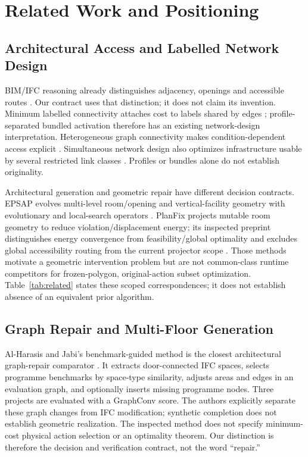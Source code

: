 \documentclass[conference]{IEEEtran}
\begin{document}
\section{Related Work and Positioning}
\subsection{Architectural Access and Labelled Network Design}
BIM/IFC reasoning already distinguishes adjacency, openings and accessible routes \cite{bim}. Our contract uses that distinction; it does not claim its invention. Minimum labelled connectivity attaches cost to labels shared by edges \cite{labels}; profile-separated bundled activation therefore has an existing network-design interpretation. Heterogeneous graph connectivity makes condition-dependent access explicit \cite{condition}. Simultaneous network design also optimizes infrastructure usable by several restricted link classes \cite{simultaneous}. Profiles or bundles alone do not establish originality.

Architectural generation and geometric repair have different decision contracts. EPSAP evolves multi-level room/opening and vertical-facility geometry with evolutionary and local-search operators \cite{epsap}. PlanFix projects mutable room geometry to reduce violation/displacement energy; its inspected preprint distinguishes energy convergence from feasibility/global optimality and excludes global accessibility routing from the current projector scope \cite{planfix}. Those methods motivate a geometric intervention problem but are not common-class runtime competitors for frozen-polygon, original-action subset optimization. Table~\ref{tab:related} states these scoped correspondences; it does not establish absence of an equivalent prior algorithm.


\subsection{Graph Repair and Multi-Floor Generation}
Al-Harasis and Jabi's benchmark-guided method is the closest architectural graph-repair comparator \cite{graphrepair}. It extracts door-connected IFC spaces, selects programme benchmarks by space-type similarity, adjusts areas and edges in an evaluation graph, and optionally inserts missing programme nodes. Three projects are evaluated with a GraphConv score. The authors explicitly separate these graph changes from IFC modification; synthetic completion does not establish geometric realization. The inspected method does not specify minimum-cost physical action selection or an optimality theorem. Our distinction is therefore the decision and verification contract, not the word ``repair.''
\end{document}
